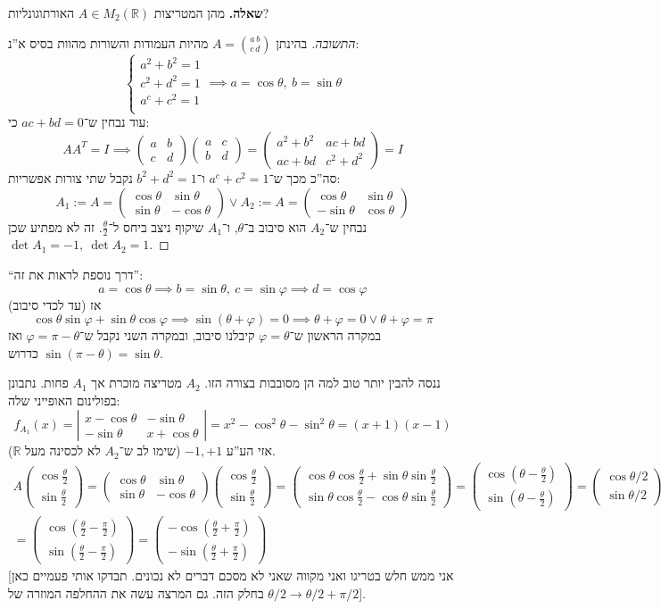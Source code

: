 \documentclass[]{article}
\newcommand\R     {\mathbb{R}}
\newcommand\vphi  {\varphi}
\newcommand\ta    {\theta}
\newcommand\pms[1]    {\begin{pmatrix}
		#1
\end{pmatrix}}
\newcommand\sof[1]    {\left | #1 \right |}
\newcommand\cl [1]    {\left ( #1 \right )}
\renewcommand\phi     {\varphi}
\theoremstyle{definition}
\begin{document}
	\textbf{שאלה. }מהן המטריצות $A \in M_2(\R)$ האורתוגונליות? \begin{proof}[התשובה]
		בהינתן $A = \binom{a\, b}{c\, d}$ מהיות העמודות והשורות מהוות בסיס א''נ:
		\[ \begin{cases}
			a^2 + b^2 = 1 \\
			c^2 + d^2 = 1 \\
			a^c + c^2 = 1 \\
		\end{cases} \implies a = \cos\ta, \ b = \sin\ta \]
		עוד נבחין ש־$ac + bd = 0$ כי: 
		\[ AA^T = I \implies \pms{a & b \\ c & d}\pms{a & c \\ b & d} = \pms{a^2 + b^2 & ac + bd \\ ac + bd & c^2 + d^2} = I \]
		סה''כ מכך ש־$a^c + c^2 = 1$ ו־$b^2 + d^2 = 1$ נקבל שתי צורות אפשריות: 
		\[ A_1:= A = \pms{\cos\ta & \sin\ta \\ \sin\ta & -\cos\ta} \lor A_2:= A = \pms{\cos\ta&\sin\ta \\ -\sin\ta & \cos\ta} \]
		נבחין ש־$A_2$ הוא סיבוב ב־$\ta$, ו־$A_1$ שיקוף ניצב ביחס ל־$\frac{\ta}{2}$. זה לא מפתיע שכן $\det A_1 = -1, \ \det A_2 = 1$. 	
	\end{proof}
	``דרך נוספת לראות את זה'': 
	\[ a = \cos\ta \implies b = \sin\ta, \ c = \sin\vphi \implies d = \cos\vphi \]
	אז (עד לכדי סיבוב)
	\[ \cos\ta \sin\vphi + \sin\ta \cos\vphi \implies \sin(\ta + \phi) = 0 \implies \ta + \phi = 0 \lor \ta + \phi = \pi \]
	במקרה הראשון ש־$\phi = \ta$ קיבלנו סיבוב, ובמקרה השני נקבל ש־$\vphi = \pi - \ta$ ואז $\sin(\pi - \ta) = \sin \ta$ כדרוש. 
	
	ננסה להבין יותר טוב למה הן מסובבות בצורה הזו. $A_2$ מטריצה מוכרת אך $A_1$ פחות. נתבונן בפולינום האופייני שלה: 
	\[ f_{A_1}(x) = \sof{\begin{matrix}
			x - \cos\ta & -\sin\ta \\ -\sin\ta & x + \cos\ta
	\end{matrix}} = x^2 - \cos^2 \ta - \sin^2\ta = (x + 1)(x - 1) \]
אזי הע''ע $-1, +1$ (שימו לב ש־$A_2$ לא לכסינה מעל $\R$). 
	\begin{multline*}
		A\pms{\cos\frac{\ta}{2}\\\sin\frac{\ta}{2}} = \pms{\cos\ta & \sin\ta \\ \sin\ta & -\cos\ta} \pms{\cos\frac{\ta}{2} \\ \sin\frac{\ta}{2}} = \pms{\cos \ta \cos \frac{\ta}{2} + \sin\ta \sin\frac{\ta}{2} \\ \sin\ta\cos\frac{\ta}{2} - \cos\ta\sin\frac{\ta}{2}} = \pms{\cos\cl{\ta - \frac{\ta}{2}} \\ \sin\cl{\ta - \frac{\ta}{2}}} = \pms{\cos\ta/2 \\ \sin\ta/2} \quad \cl{\frac{\ta}{2} \mapsto \frac{\ta}{2} + \pi} \\
		 = \pms{\cos\cl{\frac{\ta}{2} - \frac{\pi}{2}} \\ \sin\cl{\frac{\ta}{2} - \frac{\pi}{2}}} = \pms{-\cos\cl{\frac{\ta}{2} + \frac{\pi}{2}} \\ -\sin\cl{\frac{\ta}{2} + \frac{\pi}{2}}} 
	\end{multline*}
	[אני ממש חלש בטריגו ואני מקווה שאני לא מסכם דברים לא נכונים. תבדקו אותי פעמיים כאן בחלק הזה. גם המרצה עשה את ההחלפה המוזרה של $\ta/2 \to \ta/2 + \pi/2$]. 
	
\end{document}
